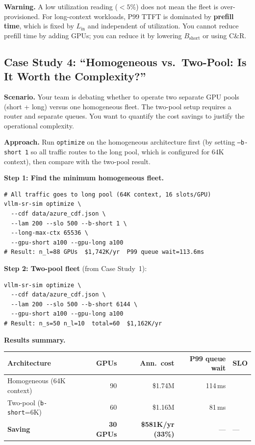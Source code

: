 \documentclass[11pt,a4paper]{article}
\newenvironment{warning}
  {\begin{mdframed}[backgroundcolor=orange!8!white,linecolor=orange!70!black,linewidth=1pt]
   \textbf{Warning. }\ignorespaces}
  {\end{mdframed}}
\newcommand{\Bshort}{B_{\text{short}}}
\begin{document}
\begin{warning}
  A low utilization reading ($< 5\%$) does not mean the fleet is
  over-provisioned.  For long-context workloads, P99 TTFT is dominated
  by \textbf{prefill time}, which is fixed by $L_{\text{in}}$ and
  independent of utilization.  You cannot reduce prefill time by
  adding GPUs; you can reduce it by lowering $\Bshort$ or using C\&R.
\end{warning}

\subsection{Case Study 4: ``Homogeneous vs.\ Two-Pool: Is It Worth the Complexity?''}
\label{sec:cs-savings}

\textbf{Scenario.}  Your team is debating whether to operate two
separate GPU pools (short + long) versus one homogeneous fleet.
The two-pool setup requires a router and separate queues.  You want
to quantify the cost savings to justify the operational complexity.

\textbf{Approach.}  Run \texttt{optimize} on the homogeneous
architecture first (by setting \texttt{--b-short 1} so all traffic
routes to the long pool, which is configured for 64K context),
then compare with the two-pool result.

\textbf{Step 1: Find the minimum homogeneous fleet.}
\begin{lstlisting}[style=shell]
# All traffic goes to long pool (64K context, 16 slots/GPU)
vllm-sr-sim optimize \
  --cdf data/azure_cdf.json \
  --lam 200 --slo 500 --b-short 1 \
  --long-max-ctx 65536 \
  --gpu-short a100 --gpu-long a100
# Result: n_l=88 GPUs  $1,742K/yr  P99 queue wait=113.6ms
\end{lstlisting}

\textbf{Step 2: Two-pool fleet} (from Case Study~1):
\begin{lstlisting}[style=shell]
vllm-sr-sim optimize \
  --cdf data/azure_cdf.json \
  --lam 200 --slo 500 --b-short 6144 \
  --gpu-short a100 --gpu-long a100
# Result: n_s=50 n_l=10  total=60  $1,162K/yr
\end{lstlisting}

\textbf{Results summary.}
\begin{center}
\begin{tabular}{lrrrl}
\toprule
Architecture & GPUs & Ann.\ cost & P99 queue wait & SLO \\
\midrule
Homogeneous (64K context)  & 90 & \$1.74M & 114\,ms & \checkmark \\
Two-pool (\texttt{b-short}=6K) & 60 & \$1.16M & 81\,ms & \checkmark \\
\midrule
\textbf{Saving} & \textbf{30 GPUs} & \textbf{\$581K/yr (33\%)} & --- & --- \\
\bottomrule
\end{tabular}
\end{center}
\end{document}
